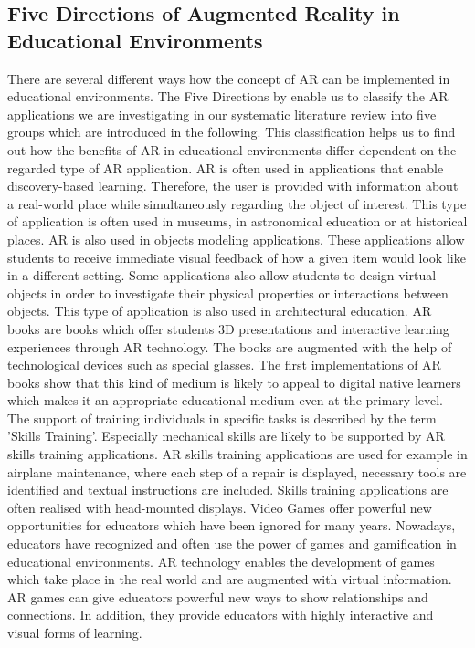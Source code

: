 \subsection[Five Directions of Augmented Reality in Educational Environments]{Five Directions of Augmented Reality in Educational Environments\autocite[\label{fn:Yuen_2011_126_130}cf.][126-130]{Yuen.2011}}
\label{subsec:FiveDirections}
There are several different ways how the concept of AR can be implemented in educational environments.\mulcit\autocite[cf.][14-18]{Lee.2012} The Five Directions by \cite{Yuen.2011} enable us to classify the AR applications we are investigating in our systematic literature review into five groups which are introduced in the following. This classification helps us to find out how the benefits of AR in educational environments differ dependent on the regarded type of AR application.
\heading{\DBL}
AR is often used in applications that enable discovery-based learning. Therefore, the user is provided with information about a real-world place while simultaneously regarding the object of interest. This type of application is often used in museums, in astronomical education or at historical places.
\heading{\OM}
AR is also used in objects modeling applications. These applications allow students to receive immediate visual feedback of how a given item would look like in a different setting. Some applications also allow students to design virtual objects in order to investigate their physical properties or interactions between objects. This type of application is also used in architectural education.
\heading{\ARB}
AR books are books which offer students 3D presentations and interactive learning experiences through AR technology. The books are augmented with the help of technological devices such as special glasses. The first implementations of AR books show that this kind of medium is likely to appeal to digital native learners which makes it an appropriate educational medium even at the primary level.
\heading{\ST}
The support of training individuals in specific tasks is described by the term 'Skills Training'. Especially mechanical skills are likely to be supported by AR skills training applications. AR skills training applications are used for example in airplane maintenance, where each step of a repair is displayed, necessary tools are identified and textual instructions are included. Skills training applications are often realised with head-mounted displays. 
\heading{\ARG}
Video Games offer powerful new opportunities for educators which have been ignored for many years. \autocite[cf.][2]{Squire.2003} %
Nowadays, educators have recognized and often use the power of games and gamification in educational environments. AR technology enables the development of games which take place in the real world and are augmented with virtual information. AR games can give educators powerful new ways to show relationships and connections. In addition, they provide educators with highly interactive and visual forms of learning.